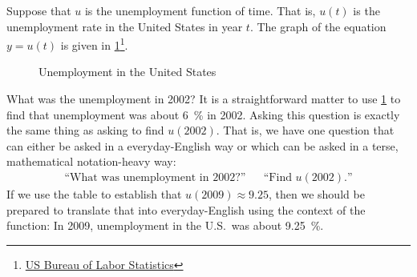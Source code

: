 	\begin{pccexample}\label{fun:ex:unemployment}
	Suppose that $u$ is the unemployment function of time. That is, $u(t)$ is the unemployment rate in the United States in year $t$. The graph of the equation $y=u(t)$ is given in \cref{fun:fig:unemployment}\footnote{\href{http://data.bls.gov/timeseries/LNS14000000}{US Bureau of Labor Statistics} }.
	
	\begin{figure}[!htb]
		\centering
		\caption{Unemployment in the United States}
		\label{fun:fig:unemployment}
	\end{figure}%
	
	What was the unemployment in 2002? It is a straightforward matter to use \cref{fun:fig:unemployment} to find that unemployment was about \SI{6}{\percent} in 2002. Asking this question is exactly the same thing as asking to find $u(2002)$. That is, we have one question that can either be asked in a everyday-English way or which can be asked in a terse, mathematical notation-heavy way:
	\begin{align*}
		\text{``What was unemployment in 2002?''} &   & \text{``Find $u(2002)$.''} 
	\end{align*}
	If we use the table to establish that $u(2009)\approx9.25$, then we should be prepared to translate that into everyday-English using the context of the function: In 2009, unemployment in the U.S.\ was about \SI{9.25}{\percent}.
	

\end{pccexample}
